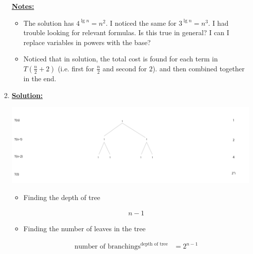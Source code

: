\documentclass[12pt]{article}
\begin{document}
\begin{enumerate}[1.]
\begin{mdframed}
\begin{itemize}
            \end{itemize}
    \end{mdframed}

    \underline{\textbf{Notes:}}

    \bigskip

    \begin{itemize}
        \item The solution has $4^{\lg n} = n^2$. I noticed the same for $3^{\lg n} = n^3$.
        I had trouble looking for relevant formulas. Is this true in general?
        I can I replace variables in powers with the base?
        \item Noticed that in solution, the total cost is found for each term in $T(\frac{n}{2} + 2)$ (i.e. first for $\frac{n}{2}$ and second for $2$).
        and then combined together in the end.
    \end{itemize}

    \item

    \bigskip
    \setcounter{equation}{0}
    \underline{\textbf{Solution:}}

    \bigskip

    \begin{center}
    \includegraphics[width=\linewidth]{images/worksheet_0_solution_8.png}
    \end{center}

    \begin{itemize}
        \item Finding the depth of tree

        \begin{align}
            n - 1
        \end{align}

        \bigskip

        \item Finding the number of leaves in the tree

        \begin{align}
            \text{number of branchings}^{\text{depth of tree}} &= 2^{n - 1}
        \end{align}


\end{itemize}
\end{enumerate}
\end{document}

